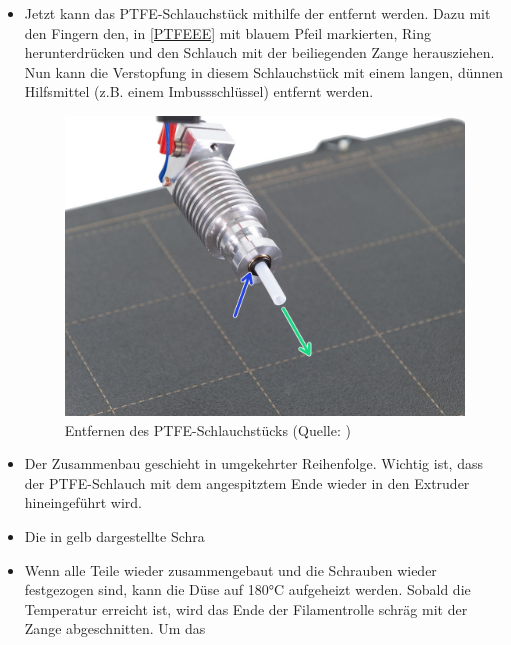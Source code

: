 \begin{itemize}
    \item Jetzt kann das PTFE-Schlauchstück mithilfe der entfernt werden. Dazu mit den Fingern den, in \autoref{PTFEEE} mit blauem Pfeil markierten, Ring herunterdrücken und den Schlauch mit der beiliegenden Zange herausziehen. Nun kann die Verstopfung in diesem Schlauchstück mit einem langen, dünnen Hilfsmittel (z.B. einem Imbussschlüssel) entfernt werden.
      \begin{figure}[h] 
        \centering
        \includegraphics[width=0.5\linewidth]{bilder/Anleitung - Entfernen des PTFE-Schlauchs.jpg}
              \caption[Anleitung: Entfernen des PTFE-Schlauchstücks] {Entfernen des PTFE-Schlauchstücks (Quelle: \autocite{Prusa})}
        \label{PTFEEE}
      \end{figure}
      \FloatBarrier

    \item Der Zusammenbau geschieht in umgekehrter Reihenfolge. Wichtig ist, dass der PTFE-Schlauch mit dem angespitztem Ende wieder in den Extruder hineingeführt wird.
    \item Die in gelb dargestellte Schra
    \item Wenn alle Teile wieder zusammengebaut und die Schrauben wieder festgezogen sind, kann die Düse auf 180°C aufgeheizt werden. Sobald die Temperatur erreicht ist, wird das Ende der Filamentrolle schräg mit der Zange abgeschnitten. Um das  
\end{itemize}